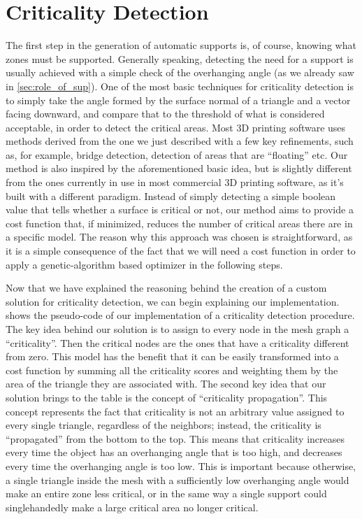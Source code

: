 \section{Criticality Detection}
\label{sec:crit_detection}

The first step in the generation of automatic supports is, of course, knowing what zones must be supported.
Generally speaking, detecting the need for a support is usually achieved with a simple check of the 
overhanging angle (as we already saw in \cref{sec:role_of_sup}).
One of the most basic techniques for criticality detection is to simply take the angle formed by the 
surface normal of a triangle and a vector facing downward, and compare that to the threshold of what
is considered acceptable, in order to detect the critical areas.
Most 3D printing software uses methods derived from the one we just described with a few
key refinements, such as, for example, bridge detection, detection of areas that are ``floating''
etc. Our method is also inspired by the aforementioned basic idea, but is slightly different from the 
ones currently in use in most commercial 3D printing software, as it's built with a different 
paradigm. Instead of simply detecting a simple boolean value that tells whether a surface is critical
or not, our method aims to provide a cost function that, if minimized, reduces the number of critical
areas there are in a specific model. The reason why this approach was chosen is straightforward, as it 
is a simple consequence of the fact that we will need a cost function in order to apply a genetic-algorithm
based optimizer in the following steps.

Now that we have explained the reasoning behind the creation of a custom solution for criticality detection,
we can begin explaining our implementation.  shows the pseudo-code of 
our implementation of a criticality detection procedure.
The key idea behind our solution is to assign to every node in the mesh graph a ``criticality''.
Then the critical nodes are the ones that have a criticality different from zero. This model has the benefit
that it can be easily transformed into a cost function by summing all the criticality scores and
weighting them by the area of the triangle they are associated with.
The second key idea that our solution brings to the table is the concept of ``criticality propagation''.
This concept represents the fact that criticality is not an arbitrary value assigned to every single
triangle, regardless of the neighbors; instead, the criticality is ``propagated'' from the bottom to the
top. This means that criticality increases every time the object has an overhanging angle that is too high,
and decreases every time the overhanging angle is too low. This is important because otherwise, a single
triangle inside the mesh with a sufficiently low overhanging angle would make an entire zone
less critical, or in the same way a single support could singlehandedly make a large critical area
no longer critical. 

